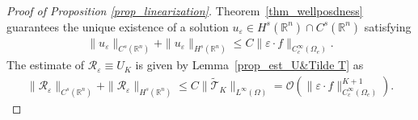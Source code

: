 \documentclass [oneside,11pt] {amsart}
\numberwithin{equation}{section}
\newcommand{\R}{\mathbb{R}}
\begin{document}
\begin{proof}[Proof of Proposition \ref{prop_linearization}]

Theorem~\ref{thm_wellposdness} guarantees the unique existence of a solution $u_\varepsilon\in H^s(\R^n)\cap C^s(\R^n)$ satisfying \begin{align}\label{Prop CS estimate for u}
\|u_\varepsilon\|_{C^s(\R^n)}+\|u_\varepsilon\|_{H^s(\R^n)}\leq C\|\varepsilon \cdot f\|_{C^\infty_c(\Omega_e)}. 
\end{align}
The estimate of $\mathcal{R}_\varepsilon\equiv U_K$ is 
given by Lemma~\ref{prop_est_U&Tilde T} as
\begin{align*}
\|\mathcal{R}_\varepsilon\|_{C^{s}(\R^n)}+\|\mathcal{R}_\varepsilon\|_{H^{s}(\R^n)}\le  C\|\widetilde{\mathcal{T}}_{K}\|_{L^\infty(\Omega)}= \mathcal{O}(\|\varepsilon\cdot f\|^{K+1}_{C^\infty_c(\Omega_e)}).
\end{align*}
\end{proof}




\end{document}
